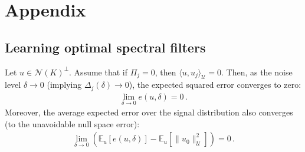 \appendix

\chapter{Appendix}

\section{Learning optimal spectral filters}\label{sec:optspectral_appendix}

\begin{thm}
Let $u \in \mathcal{N}(K)^\perp$. Assume that if $\Pi_j=0$, then $\langle u, u_j \rangle_{\mathcal{U}}=0$. Then, as the noise level $\delta \to 0$ (implying $\Delta_j(\delta) \to 0$), the expected squared error converges to zero:
\begin{align*}
\lim_{\delta \to 0} e(u, \delta) = 0 \, .
\end{align*}
Moreover, the average expected error over the signal distribution also converges (to the unavoidable null space error):
\begin{align*}
\lim_{\delta \to 0} \left( \mathbb{E}_{u}[e(u, \delta)] - \mathbb{E}_u[\|u_0\|_{\mathcal{U}}^2] \right) = 0 \, .
\end{align*}
\end{thm}
